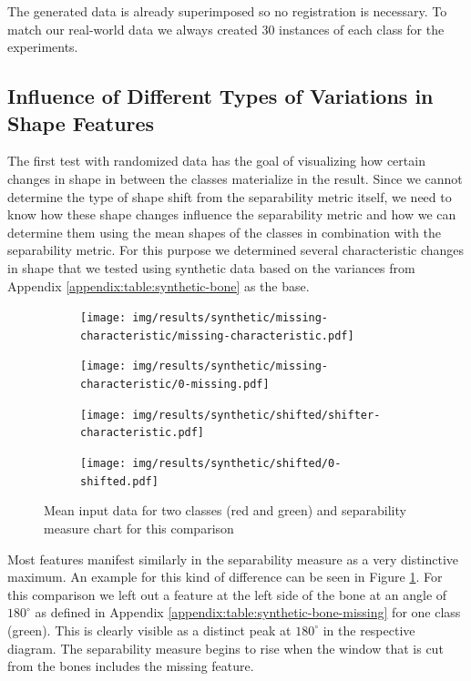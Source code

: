 \documentclass[pdftex,12pt,a4paper]{report}
\begin{document}
The generated data is already superimposed so no registration is necessary. To match our real-world data we always created 30 instances of each class for the experiments.

\subsection{Influence of Different Types of Variations in Shape Features}

The first test with randomized data has the goal of visualizing how certain changes in shape in between the classes materialize in the result. Since we cannot determine the type of shape shift from the separability metric itself, we need to know how these shape changes influence the separability metric and how we can determine them using the mean shapes of the classes in combination with the separability metric. For this purpose we determined several characteristic changes in shape that we tested using synthetic data based on the variances from Appendix \ref{appendix:table:synthetic-bone} as the base.

\begin{figure}
	\centering
	\begin{subfigure}[b]{0.45\textwidth}
		\centering
		\texttt{[image: img/results/synthetic/missing-characteristic/missing-characteristic.pdf]}
		\label{fig:diff:missing}
	\end{subfigure}
	\begin{subfigure}[b]{0.45\textwidth}
		\centering
		\texttt{[image: img/results/synthetic/missing-characteristic/0-missing.pdf]}
		\subcaption*{}
		\label{}
	\end{subfigure}
	\begin{subfigure}[b]{0.45\textwidth}
		\centering
		\texttt{[image: img/results/synthetic/shifted/shifter-characteristic.pdf]}
		\label{fig:diff:shifted}
	\end{subfigure}
	\begin{subfigure}[b]{0.45\textwidth}
		\centering
		\texttt{[image: img/results/synthetic/shifted/0-shifted.pdf]}
		\subcaption*{}
		\label{}
	\end{subfigure}
	\caption{Mean input data for two classes (red and green) and separability measure chart for this comparison}
	\label{fig:diff}
\end{figure}

Most features manifest similarly in the separability measure as a very distinctive maximum. An example for this kind of difference can be seen in Figure \ref{fig:diff:missing}. For this comparison we left out a feature at the left side of the bone at an angle of $180^\circ$ as defined in Appendix \ref{appendix:table:synthetic-bone-missing} for one class (green). This is clearly visible as a distinct peak at $180^\circ$ in the respective diagram. The separability measure begins to rise when the window that is cut from the bones includes the missing feature.  
\end{document}
